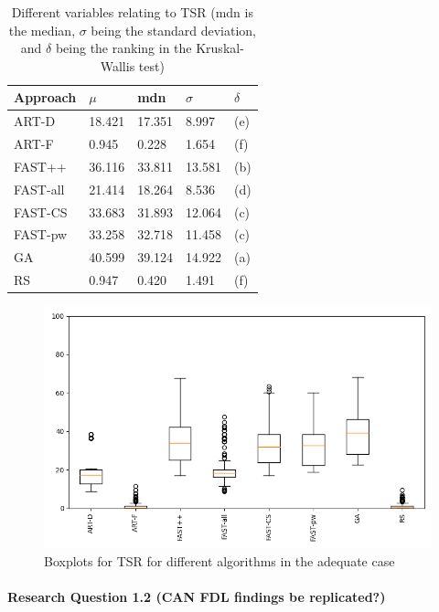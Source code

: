 \begin{table}[htpb]
	\caption[TSR statistical results, adequate]{Different variables relating to TSR (mdn is the median, $\sigma$ being the standard deviation, and $\delta$ being the ranking in the Kruskal-Wallis test)}\label{tab:tsr_stats}
	\centering
	\begin{tabular}{| l | l | l | l | l |}
	\midrule
	Approach & $\mu$ & mdn & $\sigma$ & $\delta$ \\
	\midrule
	ART-D & 18.421 & 17.351 & 8.997 & (e) \\
	ART-F & 0.945 & 0.228 & 1.654 & (f) \\
	FAST++ & 36.116 & 33.811 & 13.581 & (b) \\
	FAST-all & 21.414 & 18.264 & 8.536 & (d) \\
	FAST-CS & 33.683 & 31.893 & 12.064 & (c) \\
	FAST-pw & 33.258 & 32.718 & 11.458 & (c) \\
	GA & 40.599 & 39.124 & 14.922 & (a) \\
	RS & 0.947 & 0.420 & 1.491 & (f) \\
	\bottomrule
	\end{tabular}
\end{table}

\begin{figure}[h]
\caption[TSR boxplots, adequate]{Boxplots for TSR for different algorithms in the adequate case}\label{fig:tsr_box}
\centering
\includegraphics[scale=0.7]{figures/tsrs.png}
\end{figure}

\paragraph{Research Question 1.2 (CAN FDL findings be replicated?)}

